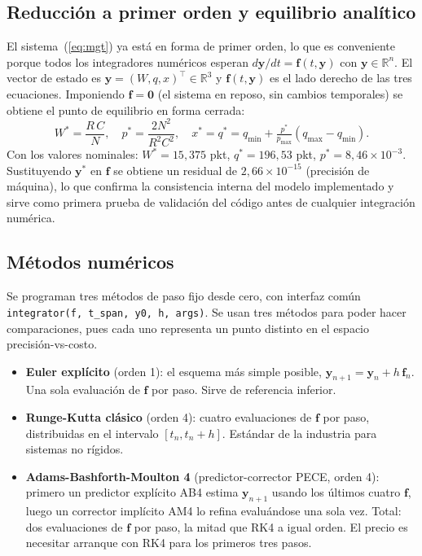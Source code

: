 \documentclass[10pt,a4paper]{article}
\begin{document}
\subsection{Reducción a primer orden y equilibrio analítico}

El sistema~(\ref{eq:mgt}) ya está en forma de primer orden, lo que es
conveniente porque todos los integradores numéricos esperan
$d\mathbf{y}/dt = \mathbf{f}(t,\mathbf{y})$ con $\mathbf{y}\in\mathbb{R}^n$.
El vector de estado es $\mathbf{y}=(W,q,x)^\top\in\mathbb{R}^3$ y
$\mathbf{f}(t,\mathbf{y})$ es el lado derecho de las tres ecuaciones.
Imponiendo $\mathbf{f}=\mathbf{0}$ (el sistema en reposo, sin cambios
temporales) se obtiene el punto de equilibrio en forma cerrada:
\begin{equation}
W^* = \frac{R\,C}{N},\quad
p^* = \frac{2N^2}{R^2 C^2},\quad
x^* = q^* = q_{\min}+\tfrac{p^*}{p_{\max}}(q_{\max}-q_{\min}).
\label{eq:eq}
\end{equation}
Con los valores nominales: $W^*=15{,}375$ pkt, $q^*=196{,}53$ pkt,
$p^*=8{,}46\times 10^{-3}$. Sustituyendo $\mathbf{y}^*$ en $\mathbf{f}$
se obtiene un residual de $2{,}66\times 10^{-15}$ (precisión de
máquina), lo que confirma la consistencia interna del modelo
implementado y sirve como primera prueba de validación del código antes
de cualquier integración numérica.

\subsection{Métodos numéricos}

Se programan tres métodos de paso fijo desde cero, con interfaz común
\texttt{integrator(f, t\_span, y0, h, args)}. Se usan tres
métodos para poder hacer comparaciones, pues cada uno representa un punto
distinto en el espacio precisión-vs-costo.

\begin{itemize}
\setlength{\itemsep}{0pt}
\item \textbf{Euler explícito} (orden 1): el esquema más simple posible,
$\mathbf{y}_{n+1}=\mathbf{y}_n + h\,\mathbf{f}_n$. Una sola evaluación
de $\mathbf{f}$ por paso. Sirve de referencia inferior.
\item \textbf{Runge-Kutta clásico} (orden 4): cuatro evaluaciones de
$\mathbf{f}$ por paso, distribuidas en el intervalo $[t_n, t_n+h]$.
Estándar de la industria para sistemas no rígidos.
\item \textbf{Adams-Bashforth-Moulton 4} (predictor-corrector PECE,
orden 4): primero un predictor explícito AB4 estima $\mathbf{y}_{n+1}$
usando los últimos cuatro $\mathbf{f}$, luego un corrector implícito AM4
lo refina evaluándose una sola vez. Total: dos evaluaciones de
$\mathbf{f}$ por paso, la mitad que RK4 a igual orden. El precio es
necesitar arranque con RK4 para los primeros tres pasos.
\end{itemize}
\end{document}
